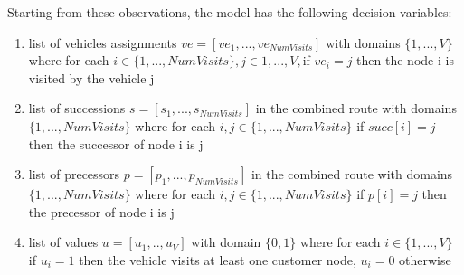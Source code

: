 Starting from these observations, the model has the following decision variables:
\begin{enumerate}
    \item list of vehicles assignments \begin{math}ve = [ve_{1}, ..., ve_{NumVisits}] \end{math} with domains \begin{math}\{1,...,V\}\end{math}where for each \begin{math}i \in \{1,..., NumVisits\}, j \in {1,...,V} ,\end{math}if \begin{math} ve_{i} = j\end{math} then the node i is visited by the vehicle j
    \item list of successions \begin{math}s=[s_{1},...,s_{NumVisits}]\end{math} in the combined route with domains \begin{math}\{1,..., NumVisits\}\end{math} where for each \begin{math}i,j \in \{1,..., NumVisits\}\end{math} if \begin{math}succ[i] = j\end{math} then the successor of node i is j
    \item list of precessors \begin{math}p=[p_{1},...,p_{NumVisits}]\end{math} in the combined route with domains \begin{math}\{1,..., NumVisits\}\end{math} where for each \begin{math}i,j \in \{1,..., NumVisits\}\end{math} if \begin{math}p[i] = j\end{math} then the precessor of node i is j
    \item list of values \begin{math}u=[u_{1},.., u_{V}]\end{math} with domain \begin{math}\{0,1\}\end{math} where for each \begin{math}i \in \{1,...,V\}\end{math} if \begin{math}u_{i} = 1 \end{math} then the vehicle visits at least one customer node, \begin{math} u_{i} = 0\end{math} otherwise
\end{enumerate}
\newpage
